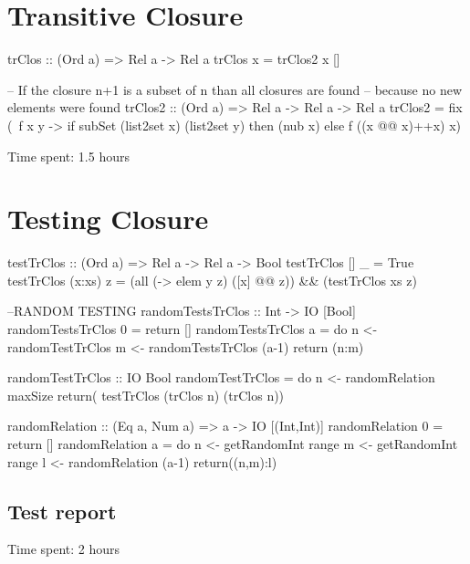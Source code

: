 \documentclass{article}
\begin{document}
\section*{Transitive Closure}
\begin{code}
trClos :: (Ord a) => Rel a -> Rel a
trClos x = trClos2 x []

-- If the closure n+1 is a subset of n than all closures are found
-- because no new elements were found
trClos2 :: (Ord a) => Rel a -> Rel a -> Rel a
trClos2  = fix (\ f x y ->
           if subSet (list2set x) (list2set y) then (nub x)
           else f ((x @@ x)++x) x) 
\end{code}

Time spent: 1.5 hours

\section*{Testing Closure}
\begin{code}
testTrClos :: (Ord a) => Rel a -> Rel a -> Bool
testTrClos [] _ = True
testTrClos (x:xs) z = (all (\y -> elem y z) ([x] @@ z)) && (testTrClos xs z)

--RANDOM TESTING
randomTestsTrClos :: Int -> IO [Bool]
randomTestsTrClos 0 = return []
randomTestsTrClos a = do 	n <- randomTestTrClos
				m <- randomTestsTrClos (a-1)
				return (n:m)

randomTestTrClos :: IO Bool
randomTestTrClos = do 	n <- randomRelation maxSize
			return( testTrClos (trClos n) (trClos n)) 

randomRelation :: (Eq a, Num a) => a -> IO [(Int,Int)]
randomRelation 0 = return []
randomRelation a = do 	n <- getRandomInt range
			m <- getRandomInt range
			l <- randomRelation (a-1)
			return((n,m):l) 

\end{code}

\subsection*{Test report}

Time spent: 2 hours
\end{document}
